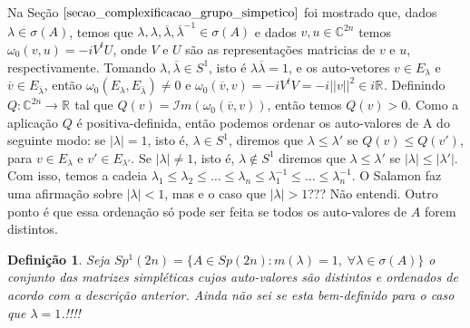 \documentclass[12pt]{book}
\newtheorem{definicao}[teorema]{Definição}
\newcommand{\circulo}{S^{1}}
\newcommand{\complexo}[1]{\mathbb{C}^{#1}}
\newcommand{\formaSimpleticaPadrao}[2]{\omega_{0}(#1, #2)}
\newcommand{\gruposimpletico}[1]{Sp(#1)}
\newcommand{\gruposimpleticoespecial}[1]{Sp^{1}(#1)}
\newcommand{\norma}[1]{||#1||}
\newcommand{\parteImaginaria}[1]{\mathcal{I}m(#1)}
\newcommand{\real}[1]{\mathbb{R}^{#1}}
\newcommand{\reta}{\real{}}
\newcommand{\vermelho}[1]{{\color{red}#1}}
\begin{document}
		Na Seção $\ref{secao_complexificacao_grupo_simpetico}$ foi mostrado que, dados $\lambda \in \sigma(A)$, temos que $\lambda, \lambda , \overline{\lambda}, \overline{\lambda}^{-1}  \in \sigma(A)$ e dados $v, u \in \complexo{2n}$ temos $\formaSimpleticaPadrao{v}{u}= -iV^{t}U$, onde $V$ e $U$ são as representações matricias de $v$ e $u$, respectivamente. Tomando $\lambda, \overline{\lambda} \in \circulo$, isto é $\lambda\overline{\lambda} = 1$, e os auto-vetores $v \in E_{\lambda}$ e $\overline{v} \in E_{\overline{\lambda}}$, então $\formaSimpleticaPadrao{E_{\lambda}}{E_{\overline{\lambda}}} \neq 0$ e $\formaSimpleticaPadrao{\overline{v}}{v} =-iV^{t}V=- i\norma{v}^{2}\in i\reta$. Definindo $Q: \complexo{2n} \to \reta$ tal que $Q(v) = \parteImaginaria{\formaSimpleticaPadrao{\overline{v}}{v}}$, então temos $Q(v)>0$. Como a aplicação $Q$ é positiva-definida, então podemos ordenar os auto-valores de A do seguinte modo: se $|\lambda| = 1$, isto é, $\lambda \in \circulo$, diremos que $\lambda \leq \lambda'$ se $ Q(v) \leq Q(v')$, para $v\in E_{\lambda}$ e $v'\in E_{\lambda'}$. Se $|\lambda| \neq 1$, isto é, $\lambda \notin \circulo$ diremos que $\lambda \leq \lambda'$ se $|\lambda| \leq |\lambda'|$. Com isso, temos a cadeia $\lambda_{1} \leq \lambda_{2} \leq \dots\leq \lambda_{n}\leq \lambda_{1}^{-1}\leq \dots\leq \lambda_{n}^{-1}$. \vermelho{O Salamon faz uma afirmação sobre $|\lambda|<1$, mas e o caso que $|\lambda|>1$??? Não entendi. Outro ponto é que essa ordenação só pode ser feita se todos os auto-valores de $A$ forem distintos.}
		
		\begin{definicao}
			
			Seja $\gruposimpleticoespecial{2n} =\{A\in \gruposimpletico{2n} : m(\lambda) = 1,\;\forall \lambda\in \sigma(A) \}$ o conjunto das matrizes simpléticas cujos auto-valores são distintos e ordenados de acordo com a descrição anterior. \vermelho{Ainda não sei se esta bem-definido para o caso que $\lambda=1$.!!!!}
		\end{definicao}
		
\end{document}
